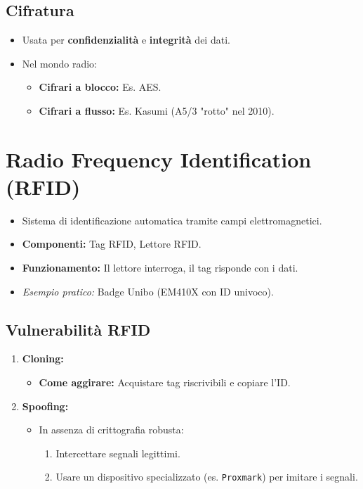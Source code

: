 \documentclass{article}
\begin{document}
\subsection{Cifratura}
\begin{itemize}
    \item Usata per \textbf{confidenzialità} e \textbf{integrità} dei dati.
    \item Nel mondo radio:
    \begin{itemize}
        \item \textbf{Cifrari a blocco:} Es. AES.
        \item \textbf{Cifrari a flusso:} Es. Kasumi (A5/3 "rotto" nel 2010).
    \end{itemize}
\end{itemize}

\section{Radio Frequency Identification (RFID)}
\begin{itemize}
    \item Sistema di identificazione automatica tramite campi elettromagnetici.
    \item \textbf{Componenti:} Tag RFID, Lettore RFID.
    \item \textbf{Funzionamento:} Il lettore interroga, il tag risponde con i dati.
    \item \textit{Esempio pratico:} Badge Unibo (EM410X con ID univoco).
\end{itemize}

\subsection{Vulnerabilità RFID}
\begin{enumerate}
    \item \textbf{Cloning:}
    \begin{itemize}
        \item \textbf{Come aggirare:} Acquistare tag riscrivibili e copiare l'ID.
    \end{itemize}
    \item \textbf{Spoofing:}
    \begin{itemize}
        \item In assenza di crittografia robusta:
        \begin{enumerate}
            \item Intercettare segnali legittimi.
            \item Usare un dispositivo specializzato (es. \texttt{Proxmark}) per imitare i segnali.
        \end{enumerate}
    \end{itemize}
\end{enumerate}
\end{document}
